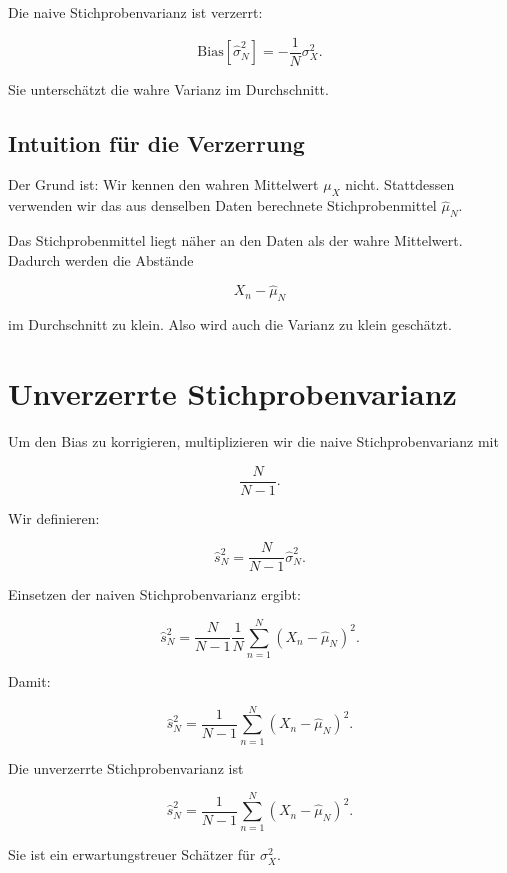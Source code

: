 \begin{conceptbox}
Die naive Stichprobenvarianz ist verzerrt:

\[
    \mathrm{Bias}[\hat{\sigma}^2_N]
    =
    -\frac{1}{N}
    \sigma_X^2.
\]

Sie unterschätzt die wahre Varianz im Durchschnitt.
\end{conceptbox}

\subsection{Intuition für die Verzerrung}

Der Grund ist:
Wir kennen den wahren Mittelwert \(\mu_X\) nicht.
Stattdessen verwenden wir das aus denselben Daten berechnete Stichprobenmittel \(\hat{\mu}_N\).

Das Stichprobenmittel liegt näher an den Daten als der wahre Mittelwert.
Dadurch werden die Abstände

\[
    X_n-\hat{\mu}_N
\]

im Durchschnitt zu klein.
Also wird auch die Varianz zu klein geschätzt.

\section{Unverzerrte Stichprobenvarianz}

Um den Bias zu korrigieren, multiplizieren wir die naive Stichprobenvarianz mit

\[
    \frac{N}{N-1}.
\]

Wir definieren:

\[
    \hat{s}^2_N
    =
    \frac{N}{N-1}
    \hat{\sigma}^2_N.
\]

Einsetzen der naiven Stichprobenvarianz ergibt:

\[
    \hat{s}^2_N
    =
    \frac{N}{N-1}
    \frac{1}{N}
    \sum_{n=1}^{N}
    (X_n-\hat{\mu}_N)^2.
\]

Damit:

\[
    \hat{s}^2_N
    =
    \frac{1}{N-1}
    \sum_{n=1}^{N}
    (X_n-\hat{\mu}_N)^2.
\]

\begin{definitionbox}
Die unverzerrte Stichprobenvarianz ist

\[
    \hat{s}^2_N
    =
    \frac{1}{N-1}
    \sum_{n=1}^{N}
    (X_n-\hat{\mu}_N)^2.
\]

Sie ist ein erwartungstreuer Schätzer für \(\sigma_X^2\).
\end{definitionbox}

